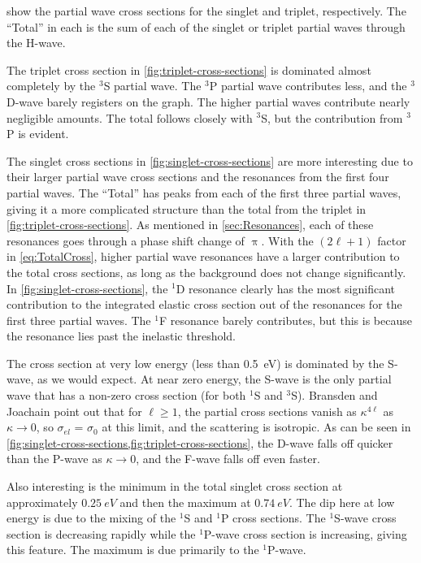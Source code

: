 \documentclass[Dissertation.tex]{subfiles}
\begin{document}
 show the partial
wave cross sections for the singlet and triplet, respectively. The ``Total''
in each is the sum of each of the singlet or triplet partial waves through the
H-wave.

The triplet cross section in \cref{fig:triplet-cross-sections} is dominated 
almost completely by the $^3$S partial wave. The $^3$P partial wave 
contributes less, and the $^3$D-wave barely registers on the graph. The 
higher partial waves contribute nearly negligible amounts. The total follows
closely with $^3$S, but the contribution from $^3$P is evident.

The singlet cross sections in \cref{fig:singlet-cross-sections} are more
interesting due to their larger partial wave cross sections and the resonances
from the first four partial waves. The ``Total'' has peaks from each of the
first three partial waves, giving it a more complicated structure than the
total from the triplet in \cref{fig:triplet-cross-sections}. As mentioned
in \cref{sec:Resonances}, each of these resonances goes through a phase shift
change of $\uppi$. With the $(2\ell+1)$ factor in \cref{eq:TotalCross},
higher partial wave resonances have a larger contribution to the total
cross sections, as long as the background does not change significantly.
In \cref{fig:singlet-cross-sections}, the $^1$D resonance clearly has the
most significant contribution to the integrated elastic cross section out of
the resonances for the first three partial waves. The $^1$F resonance barely
contributes, but this is because the resonance lies past the inelastic 
threshold.

The cross section at very low energy (less than \SI{0.5}{eV}) is dominated
by the S-wave, as we would expect. At near zero energy, the S-wave is the
only partial wave that has a non-zero cross section (for both $^1$S and $^3$S).
Bransden and Joachain \cite{Bransden2003} point out that for $\ell \geq 1$,
the partial cross sections vanish as $\kappa^{4\ell}$ as $\kappa \to 0$, so
$\sigma_{el}$ = $\sigma_0$ at this limit, and the scattering is isotropic.
As can be seen in \cref{fig:singlet-cross-sections,fig:triplet-cross-sections},
the D-wave falls off quicker than the P-wave as $\kappa \to 0$, and the F-wave
falls off even faster.

Also interesting is the minimum in the total singlet cross section at 
approximately $\SI{0.25}{eV}$ and then the maximum at $\SI{0.74}{eV}$. The dip
here at low energy is due to the mixing of the $^1$S and $^1$P cross sections.
The $^1$S-wave cross section is decreasing rapidly while the $^1$P-wave cross
section is increasing, giving this feature. The maximum is due primarily to the
$^1$P-wave.
\end{document}
